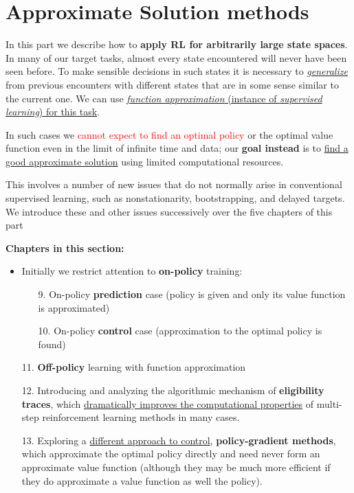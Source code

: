\documentclass[12pt, a4paper]{article}
\begin{document}
\newpage
\part{Approximate Solution methods}\label{approximate-solution-methods}


In this part we describe how to \textbf{apply RL for arbitrarily large state spaces}. In many of our target tasks, almost every state encountered will never have been seen before. To make sensible decisions in such states it is necessary to \uline{\textit{generalize}} from previous encounters with different states that are in some sense similar to the current one. We can use \uline{\textit{function approximation} (instance of \textit{supervised learning}) for this task}.


In such cases we \textcolor{red}{cannot expect to find an optimal policy} or the optimal value function even in the limit of infinite time and data; our \textbf{goal instead} is to \uline{find a good approximate solution} using limited computational resources.




This involves a number of new issues that do not normally arise in conventional supervised learning, such as nonstationarity, bootstrapping, and delayed targets. We introduce these and other issues successively over the five chapters of this part



\textbf{Chapters in this section:}

\begin{itemize}
  \item Initially we restrict attention to \textbf{on-policy} training:
  \begin{itemize}
    \item[9.] On-policy \textbf{prediction} case (policy is given and only its value function is approximated)
    \item[10.] On-policy \textbf{control} case (approximation to the optimal policy is found)
  \end{itemize}
  \item[11.] \textbf{Off-policy} learning with function approximation
  \item[12.] Introducing and analyzing the algorithmic mechanism of \textbf{eligibility traces}, which \uline{dramatically improves the computational properties} of multi-step reinforcement learning methods in many cases.
  \item[13.] Exploring a \uline{different approach to control}, \textbf{policy-gradient methods}, which approximate the optimal policy directly and need never form an approximate value function (although they may be much more efficient if they do approximate a value function as well the policy).
\end{itemize}
\end{document}
